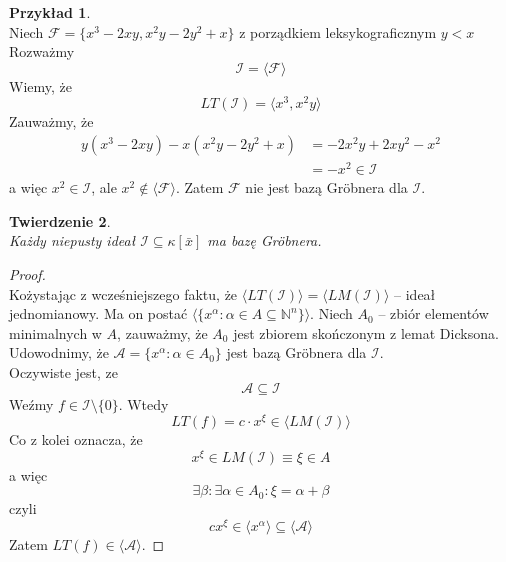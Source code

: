 \documentclass[11pt,a4paper]{article}
\newtheorem{twierdzenie}{Twierdzenie}[section]
\theoremstyle{definition}
\newtheorem{przyklad}[twierdzenie]{Przykład}
\theoremstyle{remark}
\begin{document}
\begin{przyklad}~\\
    Niech $\mathcal{F} = \{x^3-2xy, x^2y -2y^2+x\}$ z porządkiem leksykograficznym $y<x$
    Rozważmy \[
        \mathcal{I} = \langle \mathcal{F} \rangle
    \]
    Wiemy, że \[
        LT(\mathcal{I}) = \langle x^3, x^2y \rangle
    \] 
    Zauważmy, że
    \begin{align*}
        y(x^3 - 2xy) - x(x^2y - 2y^2 + x) & = -2x^2y + 2xy^2 - x^2 \\
                                          & = -x^2 \in \mathcal{I}
    \end{align*}
    a więc $x^2 \in \mathcal{I}$, ale $x^2 \notin \langle \mathcal{F} \rangle$. Zatem $\mathcal{F}$ nie jest bazą Gröbnera dla $\mathcal{I}$.

\end{przyklad}

\begin{twierdzenie}~\\
    Każdy niepusty ideał $\mathcal{I} \subseteq \kappa[\bar{x}]$ ma bazę Gröbnera.
\end{twierdzenie}
\begin{proof}~\\
    Kożystając z wcześniejszego faktu, że $\langle LT(\mathcal{I}) \rangle  = \langle LM(\mathcal{I}) \rangle$ -- ideał jednomianowy. Ma on postać
    $\langle \{x^\alpha: \alpha \in A \subseteq \mathbb{N}^n\} \rangle$. Niech $A_0$ -- zbiór elementów minimalnych w $A$, zauważmy, że $A_0$ jest zbiorem skończonym z lemat Dicksona. Udowodnimy, że $\mathcal{A} = \{ x^\alpha : \alpha \in A_0\}$ jest bazą Gröbnera dla $\mathcal{I}$.\\
    Oczywiste jest, ze \[
    \mathcal{A} \subseteq \mathcal{I}\]
   Weźmy $f \in \mathcal{I}\setminus \{0\}$. Wtedy 
    \[
        LT(f) = c \cdot x^\xi \in \langle LM(\mathcal{I}) \rangle 
    \]
    Co z kolei oznacza, że
    \[
        x^\xi \in LM(\mathcal{I}) \equiv \xi \in A
    \]
    a więc
    \[
        \exists \beta: \exists \alpha \in A_0: \xi = \alpha + \beta
    \]
    czyli
    \[
        c x^\xi \in \langle x^\alpha \rangle \subseteq \langle \mathcal{A} \rangle
    \]
    Zatem $LT(f) \in \langle \mathcal{A} \rangle$. 
\end{proof}
\end{document}
